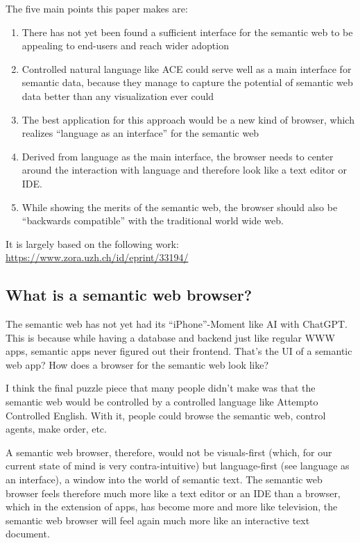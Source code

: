 \documentclass[12pt,a4paper]{article}
\begin{document}
The five main points this paper makes are:
\begin{enumerate}
    \item There has not yet been found a sufficient interface for the semantic web to be appealing to end-users and reach wider adoption
    \item Controlled natural language like ACE could serve well as a main interface for semantic data, because they manage to capture the potential of semantic web data better than any visualization ever could
    \item The best application for this approach would be a new kind of browser, which realizes ``language as an interface'' for the semantic web
    \item Derived from language as the main interface, the browser needs to center around the interaction with language and therefore look like a text editor or IDE.
    \item While showing the merits of the semantic web, the browser should also be ``backwards compatible'' with the traditional world wide web.
\end{enumerate}

It is largely based on the following work: \url{https://www.zora.uzh.ch/id/eprint/33194/}

\subsection{What is a semantic web browser?}

The semantic web has not yet had its ``iPhone''-Moment like AI with ChatGPT. This is because while having a database and backend just like regular WWW apps, semantic apps never figured out their frontend. That's the UI of a semantic web app? How does a browser for the semantic web look like?

I think the final puzzle piece that many people didn't make was that the semantic web would be controlled by a controlled language like Attempto Controlled English. With it, people could browse the semantic web, control agents, make order, etc.

A semantic web browser, therefore, would not be visuals-first (which, for our current state of mind is very contra-intuitive) but language-first (see language as an interface), a window into the world of semantic text. The semantic web browser feels therefore much more like a text editor or an IDE than a browser, which in the extension of apps, has become more and more like television, the semantic web browser will feel again much more like an interactive text document.
\end{document}
